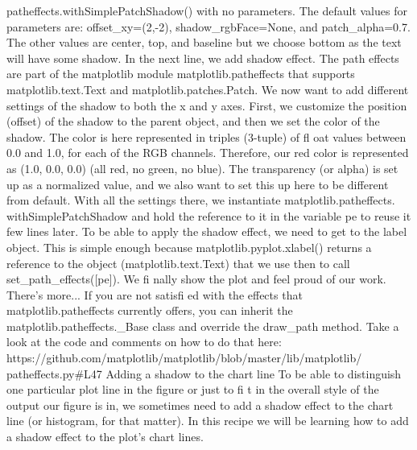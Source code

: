 patheffects.withSimplePatchShadow() with no parameters. The default values for
parameters are: offset_xy=(2,-2), shadow_rgbFace=None, and patch_alpha=0.7.
The other values are center, top, and baseline but we choose bottom as the text will
have some shadow. In the next line, we add shadow effect. The path effects are part of the
matplotlib module matplotlib.patheffects that supports matplotlib.text.Text
and matplotlib.patches.Patch.
We now want to add different settings of the shadow to both the x and y axes. First, we
customize the position (offset) of the shadow to the parent object, and then we set the color
of the shadow. The color is here represented in triples (3-tuple) of fl oat values between 0.0
and 1.0, for each of the RGB channels. Therefore, our red color is represented as (1.0,
0.0, 0.0) (all red, no green, no blue).
The transparency (or alpha) is set up as a normalized value, and we also want to set this up
here to be different from default.
With all the settings there, we instantiate matplotlib.patheffects.
withSimplePatchShadow and hold the reference to it in the variable pe to
reuse it few lines later.
To be able to apply the shadow effect, we need to get to the label object. This is simple
enough because matplotlib.pyplot.xlabel() returns a reference to the object
(matplotlib.text.Text) that we use then to call set_path_effects([pe]).
We fi nally show the plot and feel proud of our work.
There's more...
If you are not satisfi ed with the effects that matplotlib.patheffects currently offers,
you can inherit the matplotlib.patheffects._Base class and override the draw_path
method. Take a look at the code and comments on how to do that here:
https://github.com/matplotlib/matplotlib/blob/master/lib/matplotlib/
patheffects.py#L47
Adding a shadow to the chart line
To be able to distinguish one particular plot line in the figure or just to fi t in the overall style
of the output our figure is in, we sometimes need to add a shadow effect to the chart line
(or histogram, for that matter). In this recipe we will be learning how to add a shadow effect
to the plot's chart lines.
